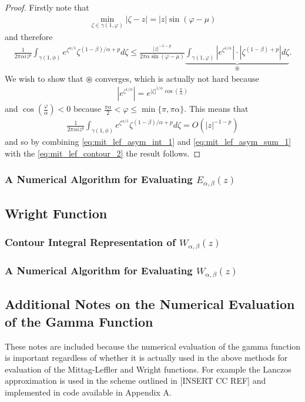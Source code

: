 \begin{proof}
    Firstly note that
    \begin{align}
        \min_{\zeta \in \gamma(1, \varphi)} |\zeta - z| = |z|\sin(\varphi - \mu)
    \end{align}
    and therefore
    \begin{align}
        \label{eq:mit_lef_contour_int_conv}
        \frac{1}{2\pi\alpha i z^p} \int_{\gamma(1,\phi)} e^{\zeta^{\alpha / 1}} \zeta^{(1-\beta)/\alpha + p} d\zeta \leq \frac{|z|^{-1-p}}{2\pi\alpha\sin(\varphi - \mu)} \underbrace{\int_{\gamma(1,\varphi)} \left| e^{\zeta^{1/\alpha}} \right| \cdot \left| \zeta^{(1-\beta)+p}\right| d\zeta}_{\circledast}.
    \end{align}
We wish to show that $ \circledast $ converges, which is actually not hard because 
\begin{align}
    \left| e^{\zeta^{1/\alpha}}\right| = e^{|\zeta|^{1/\alpha} \cos\left(\frac{\pi}{\alpha}\right)}
\end{align}
and $ \cos\left(\frac{\varphi}{\alpha}\right) < 0 $ because $ \frac{\pi \alpha}{2} < \varphi \leq \min\{\pi, \pi \alpha\} $. 
This means that 
\begin{align}
    \label{eq:mit_lef_asym_int_1}
    \frac{1}{2\pi\alpha i z^p} \int_{\gamma(1,\phi)} e^{\zeta^{\alpha / 1}} \zeta^{(1-\beta)/\alpha + p} d\zeta = O(|z|^{-1-p})
\end{align}
and so by combining \eqref{eq:mit_lef_asym_int_1} and \eqref{eq:mit_lef_asym_sum_1} with the \eqref{eq:mit_lef_contour_2} the result follows.
\end{proof}
\subsubsection{A Numerical Algorithm for Evaluating $ E_{\alpha, \beta}(z) $}
\subsection{Wright Function}
\subsubsection{Contour Integral Representation of $ W_{\alpha, \beta}(z) $}
\subsubsection{A Numerical Algorithm for Evaluating $ W_{\alpha, \beta}(z) $}

\subsection{Additional Notes on the Numerical Evaluation of the Gamma Function}
\label{sec:num-gamma}
These notes are included because the numerical evaluation of the gamma function is important regardless of
whether it is actually used in the above methods for evaluation of the Mittag-Leffler and Wright functions.
For example the Lanczos approximation is used in the scheme outlined in [INSERT CC REF] and implemented 
in code available in Appendix A.

